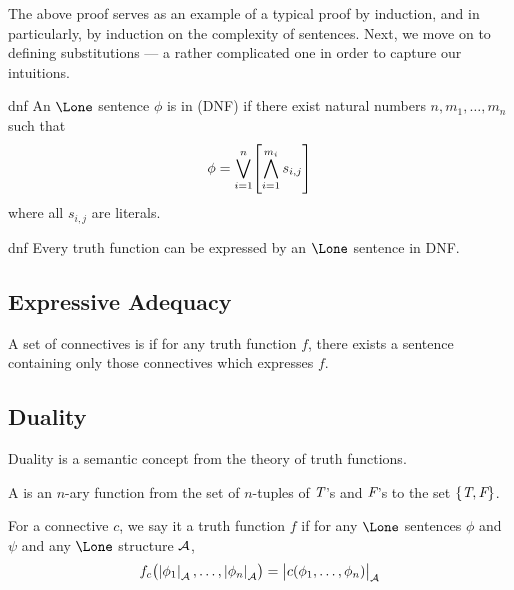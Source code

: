 \documentclass{styles/tufte}
\begin{document}
The above proof serves as an example of a typical proof by induction, and in particularly, by induction on the complexity of sentences. Next, we move on to defining substitutions --- a rather complicated one in order to capture our intuitions.

\begin{definition}{}{}
  
\end{definition}



\begin{definition}{}{dnf}
  An $\Lone$ sentence $\phi$ is in  (DNF) if there exist natural numbers $n, m_1, \dots, m_n$ such that
  \[ \phi = \disj_{i=1}^n \left[\conj_{i=1}^{m_i} s_{i,j} \right] \]
  where all $s_{i,j}$ are literals.
\end{definition}

\begin{theorem}{}{dnf}
  Every truth function can be expressed by an $\Lone$ sentence in DNF.
\end{theorem}


\subsection{Expressive Adequacy}
  
  \begin{definition}{}{}
    A set of connectives is  if for any truth function $f$, there exists a sentence containing only those connectives which expresses $f$.
  \end{definition}



\subsection{Duality}
  
  Duality is a semantic concept from the theory of truth functions.

  \begin{definition}{}{}
    A  is an $n$-ary function from the set of $n$-tuples of $\textit{T}$'s and $\textit{F}$'s to the set $\set{\textit{T}, \textit{F}}$.
  \end{definition}
  
  \begin{definition}{}{}
    For a connective $c$, we say it  a truth function $f$ if for any $\Lone$ sentences $\phi$ and $\psi$ and any $\Lone$ structure $\mathcal{A}$,
    \[ f_c\left(\valunder{\phi_1}{A}, \dots, \valunder{\phi_n}{A}\right) = \valunder{c(\phi_1, \dots, \phi_n)}{A} \]
  \end{definition}
\end{document}
